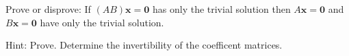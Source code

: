 
\begin{Exercise}[
name={},
title={}, 
difficulty=0,
origin={\cite{YL}}]
Prove or disprove: If $(AB)\textbf{x}=\textbf{0}$ has only the trivial solution then $A\textbf{x}=\textbf{0}$ and $B\textbf{x}=\textbf{0}$ have only the trivial solution.
\end{Exercise}

\begin{Answer}
Hint: Prove. Determine the invertibility of the coefficent matrices.
\end{Answer}
